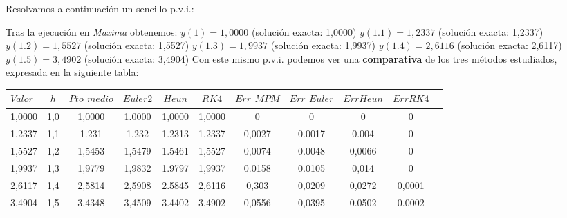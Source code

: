 \documentclass[paper=a4, fontsize=11pt]{scrartcl} %
\numberwithin{equation}{section}
\begin{document}
	\newpage
	Resolvamos a continuación un sencillo p.v.i.:
	\begin{center}
	\end{center}
	Tras la ejecución en \textit{Maxima} obtenemos:\newline
	$y(1)=1,0000$ (solución exacta: 1,0000)\newline
	$y(1.1)=1,2337$ (solución exacta: 1,2337)\newline
	$y(1.2)=1,5527$ (solución exacta: 1,5527)\newline
	$y(1.3)=1,9937$ (solución exacta: 1,9937)\newline
	$y(1.4)=2,6116$ (solución exacta: 2,6117)\newline
	$y(1.5)=3,4902$ (solución exacta: 3,4904)\newline
	\newline
	Con este mismo p.v.i. podemos ver una\textbf{ comparativa} de los tres métodos estudiados, expresada en la siguiente tabla:\newline
		\begin{tabular}[t]{|l |c|c |c |c |c |c | c | c |c|r|}
			\hline
			$Valor$ &$h$& $Pto$ $medio$ & $Euler2$ & $Heun$ & $RK4$ &$Err$ $MPM$&$Err$ $Euler$&$Err$$Heun$&$Err$$RK4$ \\
			\hline
			1,0000 &1,0& 1,0000 & 1.0000 &1,0000& 1,0000 & 0 & 0 &0& 0\\
			\hline
			1,2337&1,1& 1.231 & 1,232 & 1.2313 & 1,2337 & 0,0027 & 0.0017 &0.004& 0\\
			\hline
			1,5527&1,2& 1,5453 & 1,5479 &1.5461& 1,5527 & 0,0074 & 0.0048&0,0066& 0\\
			\hline
			1,9937&1,3& 1,9779 & 1,9832 & 1.9797& 1,9937 & 0.0158 & 0.0105& 0,014 &0\\
			\hline
			2,6117&1,4& 2,5814 & 2,5908 &2.5845& 2,6116 & 0,303 &  0,0209&0,0272& 0,0001\\
			\hline
			3,4904&1,5& 3,4348 & 3,4509 &3.4402& 3,4902 & 0,0556 & 0,0395& 0.0502&0.0002\\
			\hline
		\end{tabular}
\newpage
\end{document}
